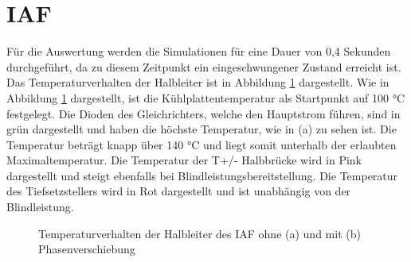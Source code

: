 \section{IAF}
Für die Auswertung werden die Simulationen für eine Dauer von 0,4 Sekunden durchgeführt, da zu diesem Zeitpunkt ein eingeschwungener Zustand erreicht ist. Das Temperaturverhalten der Halbleiter ist in Abbildung \ref{fig:iaftemp} dargestellt. Wie in Abbildung \ref{fig:iaftemp} dargestellt, ist die Kühlplattentemperatur als Startpunkt auf 100 °C festgelegt. Die Dioden des Gleichrichters, welche den Hauptstrom führen, sind in grün dargestellt und haben die höchste Temperatur, wie in (a) zu sehen ist. Die Temperatur beträgt knapp über 140 °C und liegt somit unterhalb der erlaubten Maximaltemperatur. Die Temperatur der T+/- Halbbrücke wird in Pink dargestellt und steigt ebenfalls bei Blindleistungsbereitstellung. Die Temperatur des Tiefsetzstellers wird in Rot dargestellt und ist unabhängig von der Blindleistung.  
\begin{figure}
	\centering
	\qquad
	\caption{Temperaturverhalten der Halbleiter des IAF ohne (a) und mit (b) Phasenverschiebung}
	\label{fig:iaftemp}
\end{figure}

